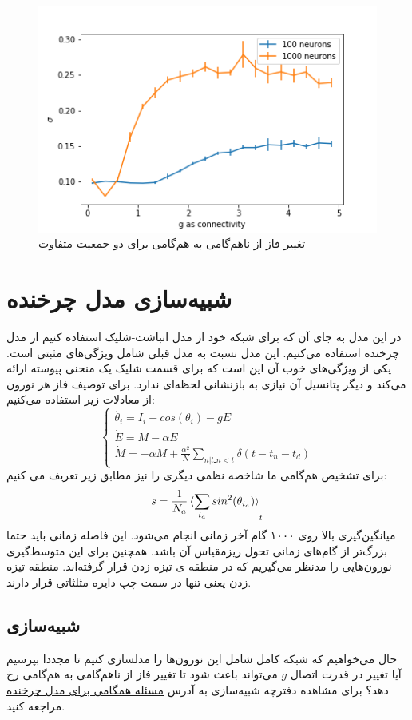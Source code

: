 \documentclass[12pt,onecolumn,a4paper]{article}
\begin{document}
\begin{figure}
\centering
  \includegraphics[width = 10 cm]{../scripts/kuramoto_model_synchoronization_problem/two_pops_sigma.png}
 \caption{تغییر فاز از ناهم‌گامی به هم‌گامی برای دو جمعیت متفاوت}
  \label{fig:two_pops_sync}
\end{figure}

\section{شبیه‌سازی مدل چرخنده}
در این مدل به جای آن که برای شبکه خود از مدل انباشت-شلیک استفاده کنیم از مدل چرخنده استفاده می‌کنیم. این مدل نسبت به مدل قبلی شامل ویژگی‌های مثبتی است. یکی از ویژگی‌های خوب آن این است که برای قسمت شلیک یک منحنی پیوسته ارائه می‌کند و دیگر پتانسیل آن نیازی به بازنشانی لحظه‌ای ندارد. برای توصیف فاز هر نورون از معادلات زیر استفاده می‌کنیم:
\begin{equation}
\begin{cases}
\dot{\theta_i}=I_i - cos(\theta_i) - g E \\
\dot{E} = M - \alpha E\\
\dot{M} = -  \alpha M + \frac{ \alpha^{2} }{N} \sum_{n|tـn<t} \delta(t - t_n - t_d)
\end{cases}
\end{equation}
برای تشخیص هم‌گامی ما شاخصه نظمی دیگری را نیز مطابق زیر تعریف می کنیم:
\begin{equation}
s = \frac{1}{N_a} \braket{\sum_{i_a} sin^{2}(\theta_{i_a})}_t
\label{eq:saman_amin_param}
\end{equation}
میانگین‌گیری بالا روی ۱۰۰۰ گام آخر زمانی انجام می‌شود. این فاصله زمانی باید حتما بزرگ‌تر از گام‌های زمانی تحول ریزمقیاس آن باشد. همچنین برای این متوسط‌گیری نورون‌هایی را مدنظر می‌گیریم که در منطقه ی تیزه زدن قرار گرفته‌اند. منطقه تیزه زدن یعنی تنها در سمت چپ دایره مثلثاتی قرار دارند.
\subsection{شبیه‌سازی}
حال می‌خواهیم که شبکه کامل شامل این نورون‌ها را مدلسازی کنیم تا مجددا بپرسیم آیا تغییر در قدرت اتصال $g$ می‌تواند باعث شود تا تغییر فاز از ناهم‌گامی به هم‌گامی رخ دهد؟ برای مشاهده دفترچه شبیه‌سازی به آدرس 
\href{run://..//scripts//rotational_model}{مسئله همگامی برای مدل چرخنده}
مراجعه کنید.
\end{document}
